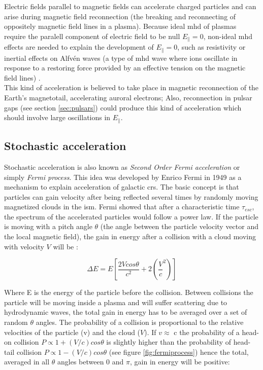 \documentclass[main.tex]{subfiles}
\begin{document}
Electric fields parallel to magnetic fields can accelerate charged particles and can arise during magnetic field reconnection (the breaking and reconnecting of oppositely magnetic field lines in a plasma). Because ideal \gls{mhd} of plasmas require the paralell component of electric field to be null $E_{\parallel} = 0 $, non-ideal \gls{mhd} effects are needed to explain the development of $E_{\parallel} = 0$, such as resistivity or inertial effects on Alfvén waves (a type of \gls{mhd} wave where ions oscillate in response to a restoring force provided by an effective tension on the magnetic field lines)  \cite{2009accelerationmech}.\\
This kind of acceleration is believed to take place in magnetic reconnection of the Earth's magnetotail, accelerating auroral electrons; Also, reconnection in pulsar gaps (see section \ref{sec:pulsars}) could produce this kind of acceleration which should involve large oscillations in $E_{\parallel}$. 


\subsection{Stochastic acceleration}

Stochastic acceleration is also known as \textit{Second Order Fermi acceleration} or simply \textit{Fermi process}. This idea was developed by Enrico Fermi in 1949 \cite{Fermi:CRorigin} as a mechanism to explain acceleration of galactic \glspl{cr}. The basic concept is that particles can gain velocity after being reflected several times by randomly moving magnetized clouds in the \gls{ism}. Fermi showed that after a characteristic time $\tau_{esc}$, the spectrum of the accelerated particles would follow a power law. If the particle is moving with a pitch angle $\theta$ (the angle between the particle velocity vector and the local magnetic field), the gain in energy after a collision with a cloud moving with velocity $V$ will be \cite{highenergyastrophy}:

\begin{equation}
    \Delta E = E \left[ \frac{2Vcos\theta}{c^2}+2\left(\frac{V}{c}^2\right)\right]
\end{equation}

Where E is the energy of the particle before the collision. Between collisions the particle will be moving inside a plasma and will suffer scattering due to hydrodynamic waves, the total gain in energy has to be averaged over a set of random $\theta$ angles. The probability of a collision is proportional to the relative velocities of the particle (v) and the cloud ($V$). If $v \approx$ c the probability of a head-on collision $P \propto 1+(V/c)cos\theta$ is slightly higher than the probability of head-tail collision $P \propto 1-(V/c)cos\theta$ (see figure \ref{fig:fermiprocess}) hence the total, averaged in all $\theta$ angles between 0 and $\pi$, gain in energy will be positive:
\end{document}

